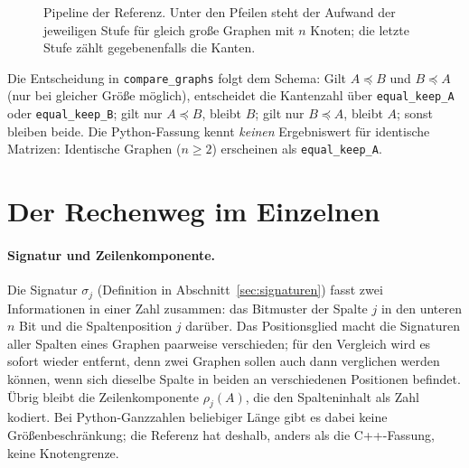 \begin{figure}[!ht]
	\centering
	\caption{Pipeline der Referenz. Unter den Pfeilen steht der Aufwand der jeweiligen Stufe für gleich große Graphen mit $n$ Knoten; die letzte Stufe zählt gegebenenfalls die Kanten.}
	\label{abb:py_pipeline}
\end{figure}

Die Entscheidung in \texttt{compare\_graphs} folgt dem Schema: Gilt $A\preceq B$ und $B\preceq A$ (nur bei gleicher Größe möglich), entscheidet die Kantenzahl über \texttt{equal\_keep\_A} oder \texttt{equal\_keep\_B}; gilt nur $A\preceq B$, bleibt $B$; gilt nur $B\preceq A$, bleibt $A$; sonst bleiben beide. Die Python-Fassung kennt \emph{keinen} Ergebniswert für identische Matrizen: Identische Graphen ($n\ge 2$) erscheinen als \texttt{equal\_keep\_A}.

\section{Der Rechenweg im Einzelnen}
\label{sec:py_rechenweg}

\paragraph{Signatur und Zeilenkomponente.} Die Signatur $\sigma_j$ (Definition in Abschnitt~\ref{sec:signaturen}) fasst zwei Informationen in einer Zahl zusammen: das Bitmuster der Spalte $j$ in den unteren $n$ Bit und die Spaltenposition $j$ darüber. Das Positionsglied macht die Signaturen aller Spalten eines Graphen paarweise verschieden; für den Vergleich wird es sofort wieder entfernt, denn zwei Graphen sollen auch dann verglichen werden können, wenn sich dieselbe Spalte in beiden an verschiedenen Positionen befindet. Übrig bleibt die Zeilenkomponente $\rho_j(A)$, die den Spalteninhalt als Zahl kodiert. Bei Python-Ganzzahlen beliebiger Länge gibt es dabei keine Größenbeschränkung; die Referenz hat deshalb, anders als die C++-Fassung, keine Knotengrenze.

